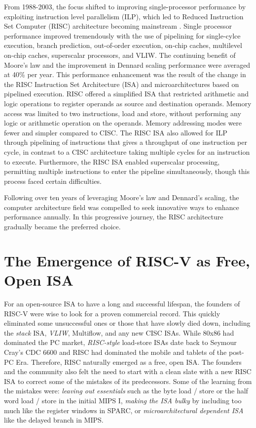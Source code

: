 \documentclass[journal]{IEEEtran}
\begin{document}
From 1988-2003, the focus shifted to improving single-processor performance by exploiting instruction level parallelism (ILP), which led to Reduced Instruction Set Computer (RISC) architecture becoming mainstream \cite{patterson_risc_1998}. Single processor performance improved tremendously with the use of pipelining for single-cylce execution, branch prediction, out-of-order execution, on-chip caches, multilevel on-chip caches, superscalar processors, and VLIW. The continuing benefit of Moore's law and the improvement in Dennard scaling performance were averaged at 40\% per year.
This performance enhancement was the result of the change in the RISC Instruction Set Architecture (ISA) and microarchitectures based on pipelined execution. RISC offered a simplified ISA that restricted arithmetic and logic operations to register operands as source and destination operands. Memory access was limited to two instructions, load and store, without performing any logic or arithmetic operation on the operands. Memory addressing modes were fewer and simpler compared to CISC. The RISC ISA also allowed for ILP through pipelining of instructions that gives a throughput of one instruction per cycle, in contrast to a CISC architecture taking multiple cycles for an instruction to execute. Furthermore, the RISC ISA enabled superscalar processing, permitting multiple instructions to enter the pipeline simultaneously, though this process faced certain difficulties. 

Following over ten years of leveraging Moore's law and Dennard's scaling, the computer architecture field was compelled to seek innovative ways to enhance performance annually. In this progressive journey, the RISC architecture gradually became the preferred choice.
 
\section{The Emergence of RISC-V as Free, Open ISA }
For an open-source ISA to have a long and successful lifespan, the founders of RISC-V were wise to look for a proven commercial record. This quickly eliminated some unsuccessful ones or those that have slowly died down, including the \textit{ stack} ISA, \textit{VLIW}, Multiflow, and any new CISC ISAs. While 80x86 had dominated the PC market, \textit{RISC-style} load-store ISAs date back to Seymour Cray's CDC 6600 and RISC had dominated the mobile and tablets of the post-PC Era. Therefore, RISC naturally emerged as a free, open ISA. The founders and the community also felt the need to start with a clean slate with a new RISC ISA to correct some of the mistakes of its predecessors. Some of the learning from the mistakes were: \textit{leaving out essentials} such as the byte load / store or the half word load / store in the initial MIPS I, \textit{making the ISA bulky} by including too much like the register windows in SPARC, or \textit{microarchitectural dependent ISA} like the delayed branch in MIPS. 
\end{document}

